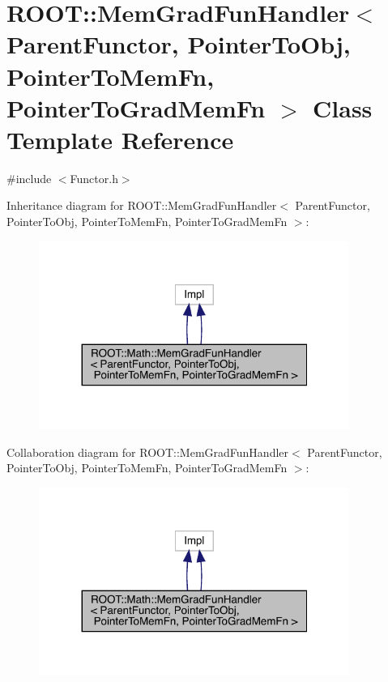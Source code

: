 \hypertarget{classROOT_1_1Math_1_1MemGradFunHandler}{}\section{R\+O\+OT\+:\+:Mem\+Grad\+Fun\+Handler$<$ Parent\+Functor, Pointer\+To\+Obj, Pointer\+To\+Mem\+Fn, Pointer\+To\+Grad\+Mem\+Fn $>$ Class Template Reference}
\label{classROOT_1_1Math_1_1MemGradFunHandler}


{\ttfamily \#include $<$Functor.\+h$>$}



Inheritance diagram for R\+O\+OT\+:\+:Mem\+Grad\+Fun\+Handler$<$ Parent\+Functor, Pointer\+To\+Obj, Pointer\+To\+Mem\+Fn, Pointer\+To\+Grad\+Mem\+Fn $>$\+:\nopagebreak
\begin{figure}[H]
\begin{center}
\leavevmode
\includegraphics[width=287pt]{d3/dfc/classROOT_1_1Math_1_1MemGradFunHandler__inherit__graph}
\end{center}
\end{figure}


Collaboration diagram for R\+O\+OT\+:\+:Mem\+Grad\+Fun\+Handler$<$ Parent\+Functor, Pointer\+To\+Obj, Pointer\+To\+Mem\+Fn, Pointer\+To\+Grad\+Mem\+Fn $>$\+:\nopagebreak
\begin{figure}[H]
\begin{center}
\leavevmode
\includegraphics[width=287pt]{d0/d1b/classROOT_1_1Math_1_1MemGradFunHandler__coll__graph}
\end{center}
\end{figure}
